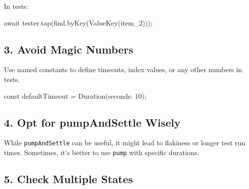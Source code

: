 \documentclass[
]{article}
\newenvironment{Shaded}{\begin{snugshade}}{\end{snugshade}}
\newcommand{\AttributeTok}[1]{\textcolor[rgb]{0.16,0.50,0.73}{#1}}
\newcommand{\DecValTok}[1]{\textcolor[rgb]{0.96,0.45,0.00}{#1}}
\newcommand{\NormalTok}[1]{\textcolor[rgb]{0.81,0.81,0.76}{#1}}
\newcommand{\OperatorTok}[1]{\textcolor[rgb]{0.81,0.81,0.76}{#1}}
\newcommand{\StringTok}[1]{\textcolor[rgb]{0.96,0.31,0.31}{#1}}
\begin{document}
\begin{Shaded}
\end{Shaded}

In tests:

\begin{Shaded}
\begin{Highlighting}[]
\AttributeTok{await}\NormalTok{ tester}\OperatorTok{.}\NormalTok{tap(find}\OperatorTok{.}\NormalTok{byKey(ValueKey(}\StringTok{\textquotesingle{}item\_2\textquotesingle{}}\NormalTok{)));}
\end{Highlighting}
\end{Shaded}

\subsection{3. Avoid Magic Numbers}\label{avoid-magic-numbers}

Use named constants to define timeouts, index values, or any other
numbers in tests.

\begin{Shaded}
\begin{Highlighting}[]
\AttributeTok{const}\NormalTok{ defaultTimeout }\OperatorTok{=}\NormalTok{ Duration(seconds}\OperatorTok{:} \DecValTok{10}\NormalTok{);}
\end{Highlighting}
\end{Shaded}

\subsection{4. Opt for pumpAndSettle
Wisely}\label{opt-for-pumpandsettle-wisely}

While \texttt{pumpAndSettle} can be useful, it might lead to flakiness
or longer test run times. Sometimes, it's better to use \texttt{pump}
with specific durations.

\subsection{5. Check Multiple States}\label{check-multiple-states}
\end{document}
